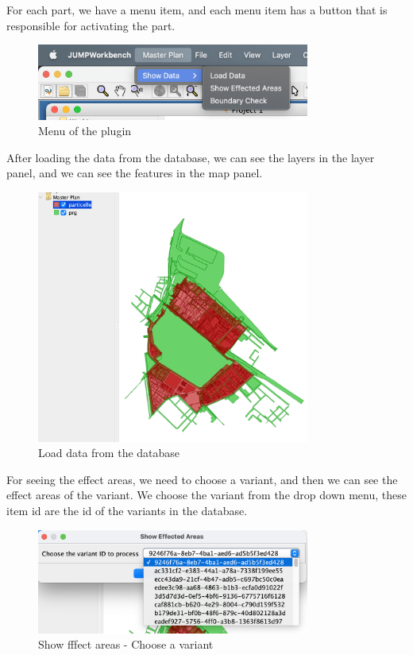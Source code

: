 For each part, we have a menu item, and each menu item has a button that is responsible for activating the part.
\begin{figure}[H]
    \centering
    \includegraphics[width=0.8\textwidth]{res/plugin/01-menu}
    \caption{Menu of the plugin}
    \label{fig:pl-menu}
\end{figure}

After loading the data from the database, we can see the layers in the layer panel, and we can see the features in the map panel.
\begin{figure}[H]
    \centering
    \includegraphics[width=0.8\textwidth]{res/plugin/02-load-data}
    \caption{Load data from the database}
    \label{fig:pl-load-data}
\end{figure}

For seeing the effect areas, we need to choose a variant, and then we can see the effect areas of the variant.
We choose the variant from the drop down menu, these item id are the id of the variants in the database.
\begin{figure}[H]
    \centering
    \includegraphics[width=0.8\textwidth]{res/plugin/03-show-areas}
    \caption{Show fffect areas - Choose a variant}
    \label{fig:pl-show-areas}
\end{figure}

